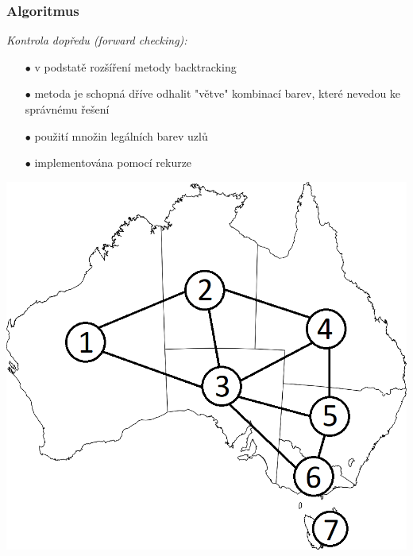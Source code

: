 \documentclass[10pt,xcolor=pdflatex]{beamer}
\begin{document}
\begin{frame}\frametitle{Algoritmus}
    \emph{Kontrola dopředu (forward checking):}
    \begin{itemize}
    \item[$\bullet$] v podstatě rozšíření metody backtracking
    \item[$\bullet$] metoda je schopná dříve odhalit "větve" kombinací barev, které nevedou ke správnému řešení
    \item[$\bullet$] použití množin legálních barev uzlů
    \item[$\bullet$] implementována pomocí rekurze
	\end{itemize}
    \includegraphics[scale=0.3]{img/australia.png}

\end{frame}
\end{document}
